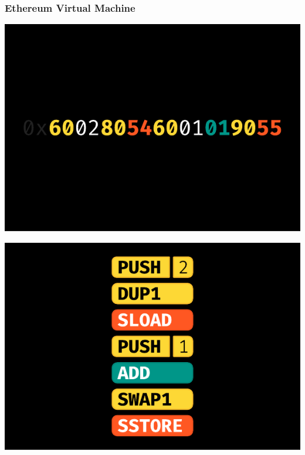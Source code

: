 \documentclass[xcolor=x11names,compress]{beamer}
\begin{document}
\begin{frame}
	\frametitle{Ethereum Virtual Machine}
	\begin{overprint}
		\begin{center}
			\includegraphics[width=\textwidth,height=0.8\textheight,keepaspectratio]{img/stackmachine/01.pdf}
		\end{center}
		\begin{center}
			\includegraphics[width=\textwidth,height=0.8\textheight,keepaspectratio]{img/stackmachine/02.pdf}
		\end{center}
		\begin{center}

\end{center}
\end{overprint}
\end{frame}
\end{document}
